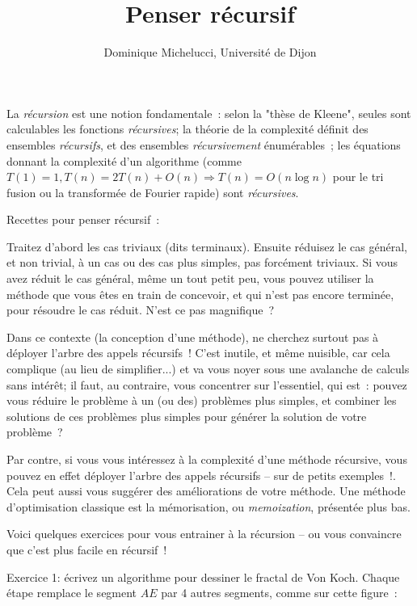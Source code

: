 \documentclass[a4paper]{article}
\begin{document}
\title{Penser r\'ecursif}
\author{Dominique Michelucci, Universit\'e de Dijon}
\maketitle

La {\it r\'ecursion} est une notion  fondamentale~:
selon  la "th\`ese de Kleene",  seules sont calculables les fonctions {\it r\'ecursives};
la th\'eorie de la complexit\'e d\'efinit des ensembles {\it r\'ecursifs}, et des ensembles {\it r\'ecursivement} \'enum\'erables~;
les \'equations donnant la complexit\'e d'un algorithme (comme $T(1)=1, T(n)=2 T(n)+O(n) \Rightarrow T(n)=O(n\log n)$ pour le tri fusion ou la transform\'ee de Fourier rapide) sont
{\it r\'ecursives}.


Recettes pour penser r\'ecursif~: 

Traitez d'abord les cas triviaux (dits terminaux).  
Ensuite r\'eduisez le cas g\'en\'eral, et  non trivial,
\`a un cas  ou des cas plus simples, pas forc\'ement triviaux.
Si vous avez r\'eduit le cas g\'en\'eral, m\^eme un tout petit peu, vous pouvez utiliser 
la m\'ethode que vous \^etes en train de concevoir,
et qui n'est pas encore termin\'ee, pour r\'esoudre  le cas r\'eduit. N'est ce pas magnifique~?


Dans ce contexte (la conception d'une m\'ethode), ne cherchez surtout pas \`a d\'eployer l'arbre des appels r\'ecursifs~!  
C'est inutile, et m\^eme nuisible, car cela 
complique (au lieu de simplifier...) et va vous noyer
sous une avalanche de calculs sans int\'er\^et; il faut, au contraire, 
vous concentrer sur l'essentiel, qui est~: pouvez vous r\'eduire le probl\`eme \`a un (ou des) 
probl\`emes plus simples, et combiner les solutions de ces probl\`emes plus simples pour
g\'en\'erer la solution de votre probl\`eme~?

Par contre, si vous vous int\'eressez \`a la complexit\'e d'une m\'ethode r\'ecursive,
vous pouvez en effet d\'eployer l'arbre des appels r\'ecursifs -- sur de petits exemples~!. 
Cela peut aussi vous sugg\'erer des am\'eliorations de votre m\'ethode. 
Une m\'ethode d'optimisation classique est la m\'emorisation, ou  {\it memoization},
pr\'esent\'ee  plus bas.

Voici quelques exercices pour vous entrainer \`a la r\'ecursion -- ou vous convaincre que c'est plus facile en r\'ecursif~!

Exercice 1: \'ecrivez un algorithme pour dessiner le fractal de Von Koch. 
Chaque \'etape remplace le segment $AE$ par 4 autres segments, comme sur cette figure~:
\end{document}
